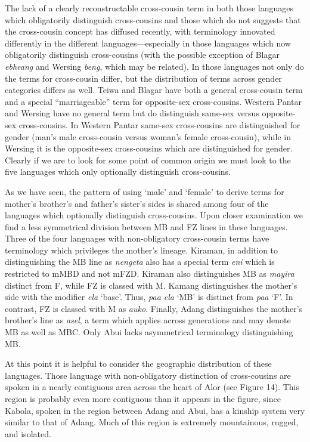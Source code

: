 The lack of a clearly reconstructable cross-cousin term in both those languages which obligatorily distinguish cross-cousins and those which do not suggests that the cross-cousin concept has diffused recently, with terminology innovated differently in the different languages---especially in those languages which now obligatorily distinguish cross-cousins (with the possible exception of Blagar \textit{ebheang} and Wersing \textit{beng}, which may be related). In those languages not only do the terms for cross-cousin differ, but the distribution of terms across gender categories differs as well. Teiwa and Blagar have both a general cross-cousin term and a special ``marriageable'' term for opposite-sex cross-cousins. Western Pantar and Wersing have no general term but do distinguish same-sex versus opposite-sex cross-cousins. In Western Pantar same-sex cross-cousins are distinguished for gender (man's male cross-cousin versus woman's female cross-cousin), while in Wersing it is the opposite-sex cross-cousins which are distinguished for gender. Clearly if we are to look for some point of common origin we must look to the five languages which only optionally distinguish cross-cousins.

As we have seen, the pattern of using `male' and `female' to derive terms for mother's brother's and father's sister's sides is shared among four of the languages which optionally distinguish cross-cousins. Upon closer examination we find a less symmetrical division between MB and FZ lines in these languages. Three of the four languages with non-obligatory cross-cousin terms have terminology which privileges the mother's lineage. Kiraman, in addition to distinguishing the MB line as \textit{nengeta} also has a special term \textit{eni} which is restricted to mMBD and not mFZD. Kiraman also distinguishes MB as \textit{mayira} distinct from F, while FZ is classed with M. Kamang distinguishes the mother's side with the modifier \textit{ela} `base'. Thus, \textit{paa ela} `MB' is distinct from \textit{paa} `F'. In contrast, FZ is classed with M as \textit{auko}. Finally, Adang distinguishes the mother's brother's line as \textit{asel}, a term which applies across generations and may denote MB as well as MBC. Only Abui lacks asymmetrical terminology distinguishing MB.

At this point it is helpful to consider the geographic distribution of these languages. Those language with non-obligatory distinction of cross-cousins are spoken in a nearly contiguous area across the heart of Alor (see Figure 14). This region is probably even more contiguous than it appears in the figure, since Kabola, spoken in the region between Adang and Abui, has a kinship system very similar to that of Adang. Much of this region is extremely mountainous, rugged, and isolated.

